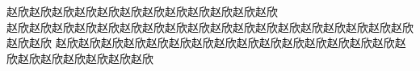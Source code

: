 \documentclass[a4paper,11pt]{ctexart}
\title{\hei{\sanhao{LATEX模板}}}
\author{\xiaosi{吴鸿毅}}
\date{2014年4月30日} %
\begin{document}
赵欣赵欣赵欣赵欣赵欣赵欣赵欣赵欣赵欣赵欣赵欣赵欣\\
赵欣赵欣赵欣赵欣赵欣赵欣赵欣赵欣赵欣赵欣赵欣赵欣赵欣赵欣赵欣赵欣赵欣赵欣赵欣赵欣
赵欣赵欣赵欣赵欣赵欣赵欣赵欣赵欣赵欣赵欣赵欣赵欣赵欣赵欣赵欣赵欣赵欣赵欣赵欣赵欣赵欣赵欣
\end{document}

